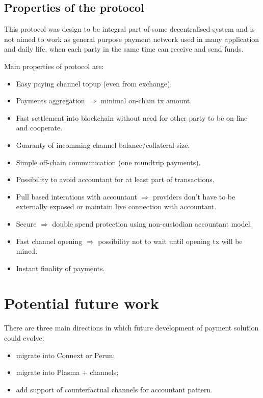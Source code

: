 \documentclass[a4paper,12pt]{article}
\begin{document}
\subsection{Properties of the protocol}

This protocol was design to be integral part of some decentralised system and 
is not aimed to work as general purpose payment network used in many 
application and daily life, when each party in the same time can receive and 
send funds. 

Main properties of protocol are:

\begin{itemize}
  \item Easy paying channel topup (even from exchange).
  \item Payments aggregation $\Longrightarrow$ minimal on-chain tx amount.
  \item Fast settlement into blockchain without need for other party to be 
  on-line and cooperate.
  \item Guaranty of incomming channel balance/collateral size.
  \item Simple off-chain communication (one roundtrip payments).
  \item Possibility to avoid accountant for at least part of transactions.
  \item Pull based interations with accountant $\Longrightarrow$ providers don't 
  have to be externally exposed or maintain live connection with accountant.
  \item Secure $\Longrightarrow$ double spend protection using non-custodian 
  accountant model.
  \item Fast channel opening $\Longrightarrow$ possibility not to wait until 
  opening tx will be mined.
  \item Instant finality of payments.
\end{itemize}

\section{Potential future work}

There are three main directions in which future development of payment solution
could evolve: 
\begin{itemize}
    \item migrate into Connext or Perun;
    \item migrate into Plasma + channels;
    \item add support of counterfactual channels for accountant pattern.
\end{itemize}
\end{document}
